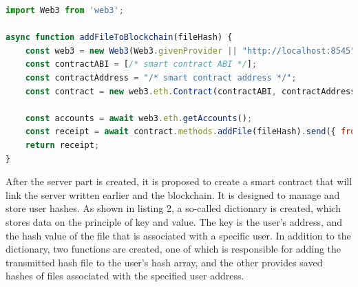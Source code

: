 \documentclass[10pt,conference,a4paper]{IEEEtran_EDM}
\begin{document}


\lstset{style=mystyle}


\begin{lstlisting}[language=JavaScript, caption=JavaScript code implementing saving to the blockchain]
import Web3 from 'web3';

async function addFileToBlockchain(fileHash) {
    const web3 = new Web3(Web3.givenProvider || "http://localhost:8545");
    const contractABI = [/* smart contract ABI */];
    const contractAddress = "/* smart contract address */";
    const contract = new web3.eth.Contract(contractABI, contractAddress);

    const accounts = await web3.eth.getAccounts();
    const receipt = await contract.methods.addFile(fileHash).send({ from: accounts[0] });
    return receipt;
}
\end{lstlisting}



After the server part is created, it is proposed to create a smart contract that will link the server written earlier and the blockchain. It is designed to manage and store user hashes. As shown in listing 2, a so-called dictionary is created, which stores data on the principle of key and value. The key is the user's address, and the hash value of the file that is associated with a specific user. In addition to the dictionary, two functions are created, one of which is responsible for adding the transmitted hash file to the user's hash array, and the other provides saved hashes of files associated with the specified user address.



\end{document}
